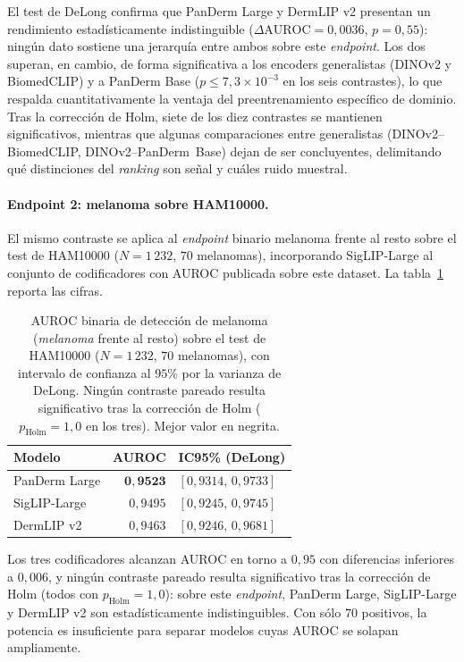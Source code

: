 El test de DeLong confirma que PanDerm Large y DermLIP v2 presentan un
rendimiento estadísticamente indistinguible
($\Delta\mathrm{AUROC} = 0{,}0036$, $p = 0{,}55$): ningún dato sostiene
una jerarquía entre ambos sobre este \emph{endpoint}. Los dos superan,
en cambio, de forma significativa a los encoders generalistas (DINOv2
y BiomedCLIP) y a PanDerm Base ($p \leq 7{,}3\times 10^{-3}$ en los
seis contrastes), lo que respalda cuantitativamente la ventaja del
preentrenamiento específico de dominio. Tras la corrección de Holm,
siete de los diez contrastes se mantienen significativos, mientras que
algunas comparaciones entre generalistas (DINOv2--BiomedCLIP,
DINOv2--PanDerm~Base) dejan de ser concluyentes, delimitando qué
distinciones del \emph{ranking} son señal y cuáles ruido muestral.

\paragraph{Endpoint 2: melanoma sobre HAM10000.}
El mismo contraste se aplica al \emph{endpoint} binario melanoma frente
al resto sobre el test de HAM10000 ($N = 1\,232$, $70$ melanomas),
incorporando SigLIP-Large al conjunto de codificadores con AUROC
publicada sobre este dataset. La tabla~\ref{tab:delong-ham} reporta las
cifras.

\begin{table}[H]
\centering
\footnotesize
\setlength{\tabcolsep}{4pt}
\renewcommand{\arraystretch}{0.95}
\caption{AUROC binaria de detección de melanoma (\emph{melanoma} frente
al resto) sobre el test de HAM10000 ($N = 1\,232$, $70$ melanomas), con
intervalo de confianza al $95\%$ por la varianza de DeLong. Ningún
contraste pareado resulta significativo tras la corrección de Holm
($p_{\mathrm{Holm}} = 1{,}0$ en los tres). Mejor valor en negrita.}
\label{tab:delong-ham}
\begin{tabular}{lrl}
\hline
Modelo          & AUROC               & IC95\% (DeLong) \\
\hline
PanDerm Large   & $\mathbf{0{,}9523}$ & $[0{,}9314,\, 0{,}9733]$ \\
SigLIP-Large    & $0{,}9495$          & $[0{,}9245,\, 0{,}9745]$ \\
DermLIP v2      & $0{,}9463$          & $[0{,}9246,\, 0{,}9681]$ \\
\hline
\end{tabular}
\end{table}

Los tres codificadores alcanzan AUROC en torno a $0{,}95$ con
diferencias inferiores a $0{,}006$, y ningún contraste pareado resulta
significativo tras la corrección de Holm (todos con $p_{\mathrm{Holm}} =
1{,}0$): sobre este \emph{endpoint}, PanDerm Large, SigLIP-Large y
DermLIP v2 son estadísticamente indistinguibles. Con sólo $70$
positivos, la potencia es insuficiente para separar modelos cuyas AUROC
se solapan ampliamente.

